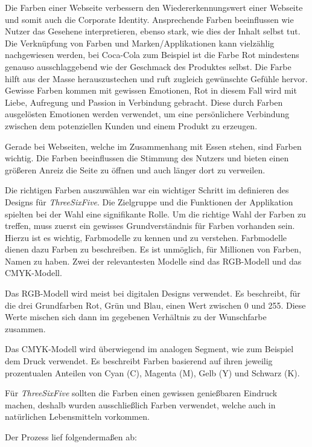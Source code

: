 Die Farben\cite{Farben} einer Webseite verbessern den Wiedererkennungswert einer Webseite und somit auch die Corporate Identity. Ansprechende Farben beeinflussen wie Nutzer das Gesehene interpretieren, ebenso stark, wie dies der Inhalt selbst tut. Die Verknüpfung von Farben und Marken/Applikationen kann vielzählig nachgewiesen werden, bei Coca-Cola zum Beispiel ist die Farbe Rot mindestens genauso ausschlaggebend wie der Geschmack des Produktes selbst. Die Farbe hilft aus der Masse herauszustechen und ruft zugleich gewünschte Gefühle hervor. Gewisse Farben kommen mit gewissen Emotionen, Rot in diesem Fall wird mit Liebe, Aufregung und Passion in Verbindung gebracht. Diese durch Farben ausgelösten Emotionen werden verwendet, um eine persönlichere Verbindung zwischen dem potenziellen Kunden und einem Produkt zu erzeugen.

Gerade bei Webseiten, welche im Zusammenhang mit Essen stehen, sind Farben wichtig. Die Farben beeinflussen die Stimmung des Nutzers und bieten einen größeren Anreiz die Seite zu öffnen und auch länger dort zu verweilen.

Die richtigen Farben auszuwählen war ein wichtiger Schritt im definieren des Designs für \textit{ThreeSixFive}. Die Zielgruppe und die Funktionen der Applikation spielten bei der Wahl eine signifikante Rolle. Um die richtige Wahl der Farben zu treffen, muss zuerst ein gewisses Grundverständnis für Farben vorhanden sein. Hierzu ist es wichtig, Farbmodelle zu kennen und zu verstehen. Farbmodelle dienen dazu Farben zu beschreiben. Es ist unmöglich, für Millionen von Farben, Namen zu haben. Zwei der relevantesten Modelle sind das RGB-Modell und das CMYK-Modell.

Das RGB-Modell wird meist bei digitalen Designs verwendet. Es beschreibt, für die drei Grundfarben Rot, Grün und Blau, einen Wert zwischen 0 und 255. Diese Werte mischen sich dann im gegebenen Verhältnis zu der Wunschfarbe zusammen.

Das CMYK-Modell wird überwiegend im analogen Segment, wie zum Beispiel dem Druck verwendet. Es beschreibt Farben basierend auf ihren jeweilig prozentualen Anteilen von Cyan (C), Magenta (M), Gelb (Y) und Schwarz (K).

Für \textit{ThreeSixFive} sollten die Farben einen gewissen genießbaren Eindruck machen, deshalb wurden ausschließlich Farben verwendet, welche auch in natürlichen Lebensmitteln vorkommen.

Der Prozess lief folgendermaßen ab:\\

